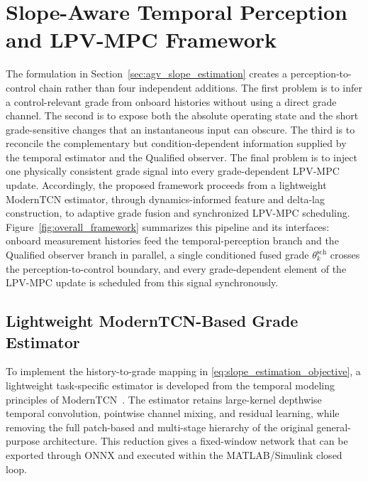 \documentclass{ieeeaccess}
\newcommand{\citep}[1]{\cite{#1}}
\begin{document}
\section{Slope-Aware Temporal Perception and LPV-MPC Framework}
\label{sec:proposed_framework}

The formulation in Section~\ref{sec:agv_slope_estimation} creates a perception-to-control chain rather than four independent additions. The first problem is to infer a control-relevant grade from onboard histories without using a direct grade channel. The second is to expose both the absolute operating state and the short grade-sensitive changes that an instantaneous input can obscure. The third is to reconcile the complementary but condition-dependent information supplied by the temporal estimator and the Qualified observer. The final problem is to inject one physically consistent grade signal into every grade-dependent LPV-MPC update. Accordingly, the proposed framework proceeds from a lightweight ModernTCN estimator, through dynamics-informed feature and delta-lag construction, to adaptive grade fusion and synchronized LPV-MPC scheduling. Figure~\ref{fig:overall_framework} summarizes this pipeline and its interfaces: onboard measurement histories feed the temporal-perception branch and the Qualified observer branch in parallel, a single conditioned fused grade $\theta_k^{\mathrm{sch}}$ crosses the perception-to-control boundary, and every grade-dependent element of the LPV-MPC update is scheduled from this signal synchronously.

\subsection{Lightweight ModernTCN-Based Grade Estimator}

To implement the history-to-grade mapping in \eqref{eq:slope_estimation_objective}, a lightweight task-specific estimator is developed from the temporal modeling principles of ModernTCN~\citep{Luo2024ModernTCN}. The estimator retains large-kernel depthwise temporal convolution, pointwise channel mixing, and residual learning, while removing the full patch-based and multi-stage hierarchy of the original general-purpose architecture. This reduction gives a fixed-window network that can be exported through ONNX and executed within the MATLAB/Simulink closed loop.
\end{document}

